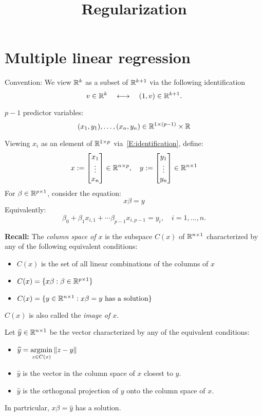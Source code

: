\documentclass[12pt]{amsart}
\begin{document}
\title{Regularization}
\maketitle

\section{Multiple linear regression}
Convention: We view $\mathbb{R}^k$ as a subset of $\mathbb{R}^{k+1}$ via the following identification
\begin{equation}\label{E:identification}
    v\in\mathbb{R}^k\quad\longleftrightarrow\quad (1, v)\in\mathbb{R}^{k+1}.
\end{equation}
    
$p-1$ predictor variables:
\[
(x_1, y_1),\ldots,(x_n, y_n)\in \mathbb{R}^{1\times (p-1)}\times \mathbb{R}
\]

Viewing $x_i$ as an element of $\mathbb{R}^{1\times p}$ via~\eqref{E:identification}, define:
\[
    x := \begin{bmatrix}x_1\\\vdots\\x_n\end{bmatrix}\in\mathbb{R}^{n\times p},
    \quad y := \begin{bmatrix}
        y_1\\\vdots\\y_n
    \end{bmatrix}\in\mathbb{R}^{n\times 1}
\]
For $\beta\in\mathbb{R}^{p\times 1}$, consider the equation:
\[
    x\beta = y
\]
Equivalently:
\[
    \beta_0 + \beta_1x_{i,1} + \cdots \beta_{p-1}x_{i,p-1} = y_i,\quad i=1,\ldots,n.
\]

\textbf{Recall:}
The \emph{column space of $x$} is the subspace $C(x)$ of $\mathbb{R}^{n\times 1}$
characterized by any of the following equivalent conditions:
\begin{itemize}\setlength\itemsep{0.5em}
    \item $C(x)$ is the set of all linear combinations of the columns of $x$
    \item $C(x)=\{x\beta : \beta\in\mathbb{R}^{p\times 1}\}$
    \item $C(x)=\{y\in\mathbb{R}^{n\times 1} : \text{$x\beta=y$ has a solution}\}$
\end{itemize}
$C(x)$ is also called the \emph{image of $x$}.

Let $\widehat y\in\mathbb{R}^{n\times 1}$ be the vector characterized by any of the
equivalent conditions:
\begin{itemize}\setlength\itemsep{0.5em}
    \item $\displaystyle{\widehat y = \operatorname*{argmin}\limits_{z\in C(x)}\|z - y\|}$
    \item $\hat y$ is the vector in the column space of $x$ closest to $y$.
    \item $\hat y$ is the orthogonal projection of $y$ onto the column space of $x$.
\end{itemize}
In partricular, $x\beta = \hat y$ has a solution.
\end{document}
